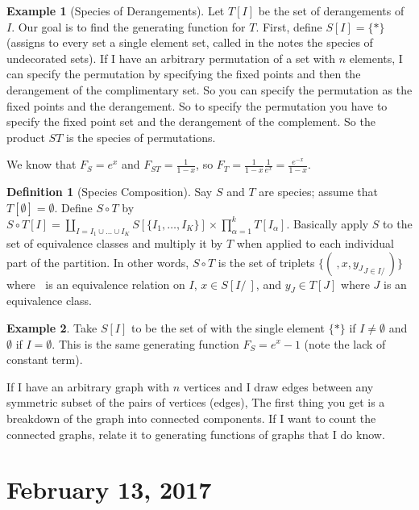 \documentclass[12pt]{article}
\theoremstyle{definition}
\newtheorem{defn}{Definition}
\newtheorem{exmp}{Example}[section]
\begin{document}
\begin{exmp}[Species of Derangements]
    Let $T[I]$ be the set of derangements of $I$. Our goal is to find the
    generating function for $T$. First, define $S[I] = \{*\}$ (assigns to every
    set a single element set, called in the notes the species of undecorated
    sets). If I have an arbitrary permutation of a set with $n$ elements, I can
    specify the permutation by specifying the fixed points and then the
    derangement of the complimentary set. So you can specify the permutation as
    the fixed points and the derangement. So to specify the permutation you
    have to specify the fixed point set and the derangement of the complement.
    So the product $ST$ is the species of permutations.

    We know that $F_S = e^x$ and $F_{ST} = \frac{1}{1-x}$, so $F_T =
    \frac{1}{1-x}\frac{1}{e^x} = \frac{e^{-x}}{1-x}$.
\end{exmp}

\begin{defn}[Species Composition]
    Say $S$ and $T$ are species; assume that $T[\emptyset] = \emptyset$. Define
    $S \circ T$ by $S\circ T[I] = \coprod_{I = I_1 \cup \ldots \cup I_K}
    S[\{I_1, \ldots, I_K\}] \times \prod_{\alpha = 1}^k T[I_\alpha]$. Basically
    apply $S$ to the set of equivalence classes and multiply it by $T$ when
    applied to each individual part of the partition. In other words, $S \circ
    T$ is the set of triplets $\{(~, x, {y_J}_{J \in I/~})\}$
    where $~$ is an equivalence relation on $I$, $x \in S[I/~]$, and $y_J \in
    T[J]$ where $J$ is an equivalence class.
\end{defn}

\begin{exmp}
    Take $S[I]$ to be the set of with the single element $\{*\}$ if $I \ne
    \emptyset$ and $\emptyset$ if $I = \emptyset$. This is the same generating
    function $F_S = e^x - 1$ (note the lack of constant term).

    If I have an arbitrary graph with $n$ vertices and I draw edges between any
    symmetric subset of the pairs of vertices (edges), The first thing you get
    is a breakdown of the graph into connected components. If I want to count
    the connected graphs, relate it to generating functions of graphs that I do
    know.
\end{exmp}

\section{February 13, 2017}
\end{document}
